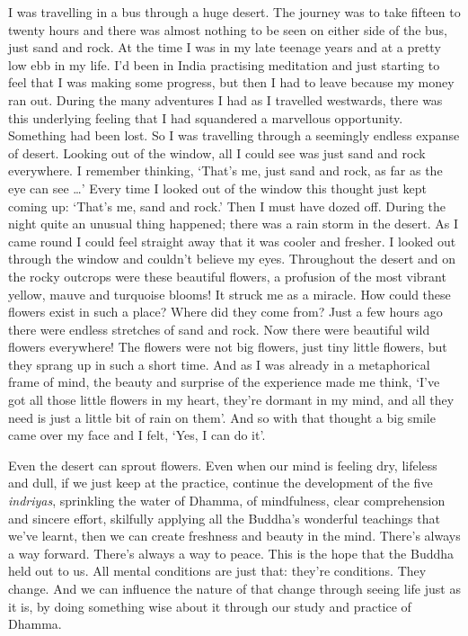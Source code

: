 I was travelling in a bus through a huge desert. The journey was to take
fifteen to twenty hours and there was almost nothing to be seen on
either side of the bus, just sand and rock. At the time I was in my late
teenage years and at a pretty low ebb in my life. I'd been in India
practising meditation and just starting to feel that I was making some
progress, but then I had to leave because my money ran out. During the
many adventures I had as I travelled westwards, there was this
underlying feeling that I had squandered a marvellous opportunity. 
Something had been lost. So I was travelling through a seemingly endless
expanse of desert. Looking out of the window, all I could see was just
sand and rock everywhere. I remember thinking, `That's me, just sand and
rock, as far as the eye can see \ldots{}' Every time I looked out of the
window this thought just kept coming up: `That's me, sand and rock.'
Then I must have dozed off. During the night quite an unusual thing
happened; there was a rain storm in the desert. As I came round I could
feel straight away that it was cooler and fresher. I looked out through
the window and couldn't believe my eyes. Throughout the desert and on
the rocky outcrops were these beautiful flowers, a profusion of the most
vibrant yellow, mauve and turquoise blooms! It struck me as a miracle. 
How could these flowers exist in such a place? Where did they come from? 
Just a few hours ago there were endless stretches of sand and rock. Now
there were beautiful wild flowers everywhere! The flowers were not big
flowers, just tiny little flowers, but they sprang up in such a short
time. And as I was already in a metaphorical frame of mind, the beauty
and surprise of the experience made me think, `I've got all those little
flowers in my heart, they're dormant in my mind, and all they need is
just a little bit of rain on them'. And so with that thought a big smile
came over my face and I felt, `Yes, I can do it'. 

Even the desert can sprout flowers. Even when our mind is feeling dry, 
lifeless and dull, if we just keep at the practice, continue the
development of the five \emph{indriyas}, sprinkling the water of Dhamma, 
of mindfulness, clear comprehension and sincere effort, skilfully
applying all the Buddha's wonderful teachings that we've learnt, then we
can create freshness and beauty in the mind. There's always a way
forward. There's always a way to peace. This is the hope that the Buddha
held out to us. All mental conditions are just that: they're conditions. 
They change. And we can influence the nature of that change through
seeing life just as it is, by doing something wise about it through our
study and practice of Dhamma. 

